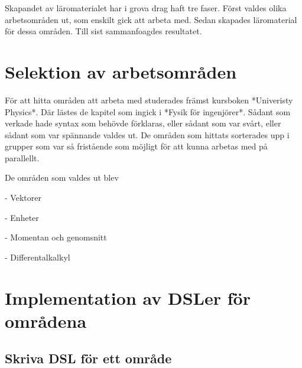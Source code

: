 \begin{binge}
Skapandet av läromaterialet har i grova drag haft tre faser. Först valdes olika
arbetsområden ut, som enskilt gick att arbeta med. Sedan skapades läromaterial
för dessa områden. Till sist sammanfoagdes resultatet.



\section{Selektion av arbetsområden}


För att hitta områden att arbeta med studerades främst kursboken *Univeristy
Physics*. Där lästes de kapitel som ingick i *Fysik för ingenjörer*. Sådant som
verkade hade syntax som behövde förklaras, eller sådant som var svårt, eller
sådant som var spännande valdes ut. De områden som hittats sorterades upp i
grupper som var så fristående som möjligt för att kunna arbetas med på
parallellt.

De områden som valdes ut blev

- Vektorer

- Enheter

- Momentan och genomsnitt

- Differentalkalkyl


\section{Implementation av DSLer för områdena}

\subsection{Skriva DSL för ett område}


\end{binge}

